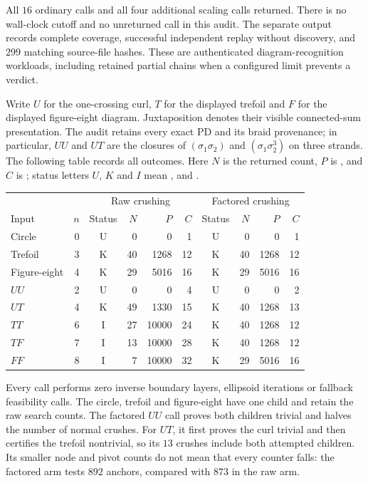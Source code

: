 All $16$ ordinary calls and all four additional scaling calls returned.
There is no wall-clock cutoff and no unreturned call in this audit.
The separate output  records complete
coverage, successful independent replay without discovery, and $299$
matching source-file hashes.  These are authenticated diagram-recognition
workloads, including retained partial chains when a configured limit
prevents a verdict.

Write $U$ for the one-crossing curl, $T$ for the displayed trefoil and $F$
for the displayed figure-eight diagram.  Juxtaposition denotes their
visible connected-sum presentation.  The audit retains every exact PD and
its braid provenance; in particular, $UU$ and $UT$ are the closures of
$(\sigma_1\sigma_2)$ and $(\sigma_1\sigma_2^3)$ on three strands.
The following table records all outcomes.  Here $N$ is the returned
 count, $P$ is , and $C$ is
; status letters $U$, $K$ and $I$ mean ,
 and .

\begin{center}\small
\setlength{\tabcolsep}{4pt}
\begin{tabular}{lrcrrrcrrr}
\toprule
& & \multicolumn{4}{c}{Raw crushing} & \multicolumn{4}{c}{Factored crushing}\\
Input & $n$ & Status & $N$ & $P$ & $C$ & Status & $N$ & $P$ & $C$\\
\midrule
Circle & 0 & U & 0 & 0 & 1 & U & 0 & 0 & 1\\
Trefoil & 3 & K & 40 & 1268 & 12 & K & 40 & 1268 & 12\\
Figure-eight & 4 & K & 29 & 5016 & 16 & K & 29 & 5016 & 16\\
$UU$ & 2 & U & 0 & 0 & 4 & U & 0 & 0 & 2\\
$UT$ & 4 & K & 49 & 1330 & 15 & K & 40 & 1268 & 13\\
$TT$ & 6 & I & 27 & 10000 & 24 & K & 40 & 1268 & 12\\
$TF$ & 7 & I & 13 & 10000 & 28 & K & 40 & 1268 & 12\\
$FF$ & 8 & I & 7 & 10000 & 32 & K & 29 & 5016 & 16\\
\bottomrule
\end{tabular}
\end{center}

Every call performs zero inverse boundary layers, ellipsoid iterations or
fallback feasibility calls.  The circle, trefoil and figure-eight
have one child and retain the raw search counts.  The factored $UU$ call
proves both children trivial and halves the number of normal crushes.
For $UT$, it first proves the curl trivial and then certifies the trefoil
nontrivial, so its $13$ crushes include both attempted children.  Its
smaller node and pivot counts do not mean that every counter falls: the
factored arm tests $892$ anchors, compared with $873$ in the raw arm.

